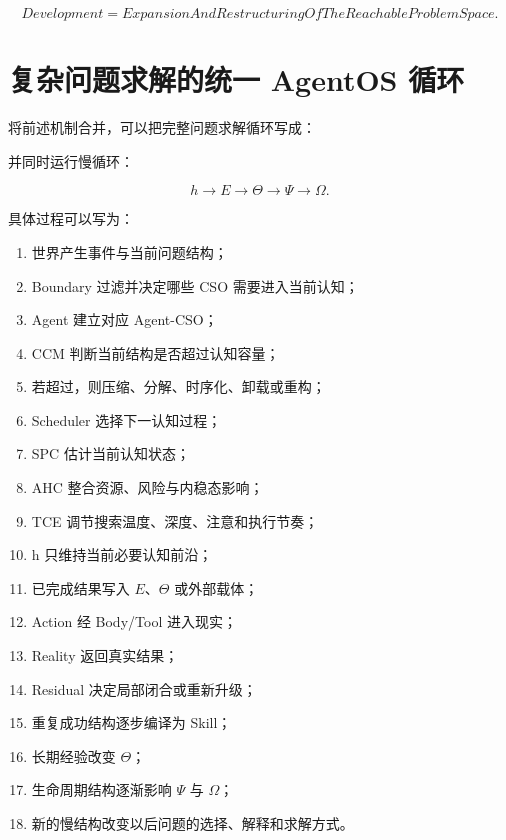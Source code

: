 \begin{equation}
\boxed{
Development
=
ExpansionAndRestructuringOfTheReachableProblemSpace.
}
\end{equation}

\section{复杂问题求解的统一 AgentOS 循环}

将前述机制合并，可以把完整问题求解循环写成：

\begin{statementbox}
\centering
{}
\end{statementbox}

并同时运行慢循环：

\begin{equation}
h
\rightarrow
E
\rightarrow
\Theta
\rightarrow
\Psi
\rightarrow
\Omega.
\end{equation}

具体过程可以写为：

\begin{enumerate}
    \item 世界产生事件与当前问题结构；
    \item Boundary 过滤并决定哪些 CSO 需要进入当前认知；
    \item Agent 建立对应 Agent-CSO；
    \item CCM 判断当前结构是否超过认知容量；
    \item 若超过，则压缩、分解、时序化、卸载或重构；
    \item Scheduler 选择下一认知过程；
    \item SPC 估计当前认知状态；
    \item AHC 整合资源、风险与内稳态影响；
    \item TCE 调节搜索温度、深度、注意和执行节奏；
    \item h 只维持当前必要认知前沿；
    \item 已完成结果写入 $E$、$\Theta$ 或外部载体；
    \item Action 经 Body/Tool 进入现实；
    \item Reality 返回真实结果；
    \item Residual 决定局部闭合或重新升级；
    \item 重复成功结构逐步编译为 Skill；
    \item 长期经验改变 $\Theta$；
    \item 生命周期结构逐渐影响 $\Psi$ 与 $\Omega$；
    \item 新的慢结构改变以后问题的选择、解释和求解方式。
\end{enumerate}

